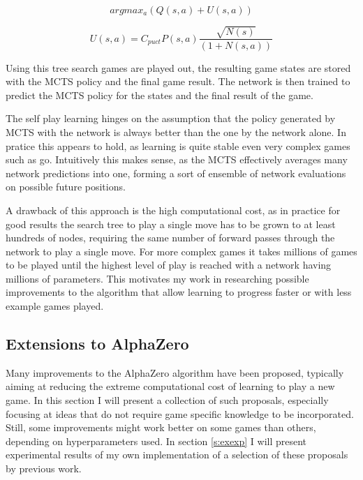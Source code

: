 \documentclass[12pt,onecolumn,oneside,titlepage]{article}
\begin{document}
\begin{equation}
 argmax_a(Q(s, a) + U(s, a))\label{eq:alpha_max_zero}
\end{equation}

\begin{equation}
 U(s,a) = C_{puct} P(s,a) \frac{\sqrt{N(s)}}{(1+N(s,a))}\label{eq:alpha_zero_u}
\end{equation}

Using this tree search games are played out, the resulting game states are stored with the MCTS policy and the final game result. The network is then trained to predict the MCTS policy for the states and the final result of the game.

The self play learning hinges on the assumption that the policy generated by MCTS with the network is always better than the one by the network alone. In pratice this appears to hold, as learning is quite stable even very complex games such as go. Intuitively this makes sense,
as the MCTS effectively averages many network predictions into one, forming a sort of ensemble of network evaluations on possible future positions.

A drawback of this approach is the high computational cost, as in practice for good results the search tree to play a single move has to be grown to at least hundreds of nodes, requiring the same number of forward passes through the network to play a single move.
For more complex games it takes millions of games to be played until the highest level of play is reached with a network having millions of parameters. This motivates my work in researching possible improvements to the algorithm that allow learning to progress
faster or with less example games played.

\subsection{Extensions to AlphaZero}

Many improvements to the AlphaZero algorithm have been proposed, typically aiming at reducing the extreme computational cost of learning to play a new game.
In this section I will present a collection of such proposals, especially focusing at ideas that do not require game specific knowledge to be incorporated. Still, some improvements might work better on some games than others,
depending on hyperparameters used. In section \ref{s:exexp} I will present experimental results of my own implementation of a selection of these proposals by previous work.
\end{document}
